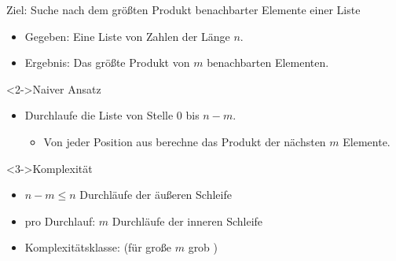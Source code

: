 \begin{frame}
    \begin{block}{Ziel: Suche nach dem größten Produkt benachbarter Elemente einer Liste}
        \begin{itemize}
            \item Gegeben: Eine Liste von Zahlen der Länge $n$.
            \item Ergebnis: Das größte Produkt von $m$ benachbarten Elementen.
        \end{itemize}
    \end{block}
    \begin{block}<2->{Naiver Ansatz}
        \begin{itemize}
            \item Durchlaufe die Liste von Stelle $0$ bis $n-m$.
            \begin{itemize}
                \item Von jeder Position aus berechne das Produkt der nächsten $m$ Elemente.
            \end{itemize}
        \end{itemize}
    \end{block}
    \begin{block}<3->{Komplexität}
        \begin{itemize}
            \item $n-m \leq n$ Durchläufe der äußeren Schleife
            \item pro Durchlauf: $m$ Durchläufe der inneren Schleife
            \item Komplexitätsklasse:  (für große $m$ grob \osquare)
        \end{itemize}
    \end{block}
\end{frame}

